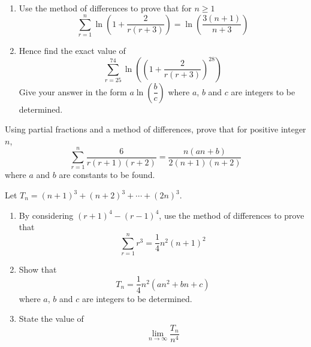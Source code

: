 \documentclass[leqno]{article}
\begin{document}
\begin{enumerate}[
  label=\textbf{\arabic*.},
  leftmargin=*,
  topsep=0pt,
  partopsep=0pt,
  parsep=0pt
]
\newpage

\questionitem

\begin{enumerate}[label=\textbf{(\alph*)}]
  \item Use the method of differences to prove that for $n \ge 1$
  \[
  \sum_{r=1}^{n} \ln\left(1+\frac{2}{r(r+3)}\right)=\ln\left(\frac{3(n+1)}{n+3}\right)
  \]
  \item Hence find the exact value of
  \[
  \sum_{r=25}^{74} \ln\left(\left(1+\frac{2}{r(r+3)}\right)^{28}\right)
  \]
  Give your answer in the form $a\ln\left(\dfrac{b}{c}\right)$ where $a$, $b$ and $c$ are integers to be determined.  \\
\end{enumerate}

\newpage

\questionitem

Using partial fractions and a method of differences, prove that for positive integer $n$,
\[
\sum_{r=1}^{n} \frac{6}{r(r+1)(r+2)} = \frac{n(an+b)}{2(n+1)(n+2)}
\]
where $a$ and $b$ are constants to be found.  \\

\newpage

\questionitem

Let $T_n = (n+1)^3 + (n+2)^3 + \cdots + (2n)^3$. \\
\begin{enumerate}[label=\textbf{(\alph*)}]
  \item By considering $(r+1)^4-(r-1)^4$, use the method of differences to prove that
  \[
  \sum_{r=1}^{n} r^3 = \frac{1}{4}n^2(n+1)^2
  \]
  \item Show that \[T_n = \frac{1}{4}n^2(an^2+bn+c)\] where $a$, $b$ and $c$ are integers to be determined.  \\
  \item State the value of \[\lim_{n \to \infty} \frac{T_n}{n^4}\]  \\
\end{enumerate}

\newpage

\questionitem


\end{enumerate}
\end{document}
